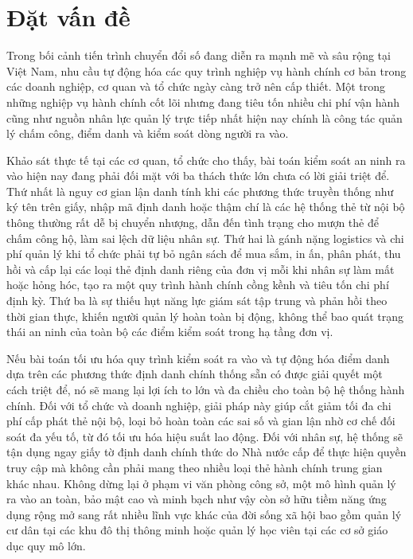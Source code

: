 \documentclass[../DoAn.tex]{subfiles}
\begin{document}
\section{Đặt vấn đề}
\label{section:1.1}

Trong bối cảnh tiến trình chuyển đổi số đang diễn ra mạnh mẽ và sâu rộng tại Việt Nam, nhu cầu tự động hóa các quy trình nghiệp vụ hành chính cơ bản trong các doanh nghiệp, cơ quan và tổ chức ngày càng trở nên cấp thiết. Một trong những nghiệp vụ hành chính cốt lõi nhưng đang tiêu tốn nhiều chi phí vận hành cũng như nguồn nhân lực quản lý trực tiếp nhất hiện nay chính là công tác quản lý chấm công, điểm danh và kiểm soát dòng người ra vào. 

Khảo sát thực tế tại các cơ quan, tổ chức cho thấy, bài toán kiểm soát an ninh ra vào hiện nay đang phải đối mặt với ba thách thức lớn chưa có lời giải triệt để. Thứ nhất là nguy cơ gian lận danh tính khi các phương thức truyền thống như ký tên trên giấy, nhập mã định danh hoặc thậm chí là các hệ thống thẻ từ nội bộ thông thường rất dễ bị chuyển nhượng, dẫn đến tình trạng cho mượn thẻ để chấm công hộ, làm sai lệch dữ liệu nhân sự. Thứ hai là gánh nặng logistics và chi phí quản lý khi tổ chức phải tự bỏ ngân sách để mua sắm, in ấn, phân phát, thu hồi và cấp lại các loại thẻ định danh riêng của đơn vị mỗi khi nhân sự làm mất hoặc hỏng hóc, tạo ra một quy trình hành chính cồng kềnh và tiêu tốn chi phí định kỳ. Thứ ba là sự thiếu hụt năng lực giám sát tập trung và phản hồi theo thời gian thực, khiến người quản lý hoàn toàn bị động, không thể bao quát trạng thái an ninh của toàn bộ các điểm kiểm soát trong hạ tầng đơn vị.

Nếu bài toán tối ưu hóa quy trình kiểm soát ra vào và tự động hóa điểm danh dựa trên các phương thức định danh chính thống sẵn có được giải quyết một cách triệt để, nó sẽ mang lại lợi ích to lớn và đa chiều cho toàn bộ hệ thống hành chính. Đối với tổ chức và doanh nghiệp, giải pháp này giúp cắt giảm tối đa chi phí cấp phát thẻ nội bộ, loại bỏ hoàn toàn các sai số và gian lận nhờ cơ chế đối soát đa yếu tố, từ đó tối ưu hóa hiệu suất lao động. Đối với nhân sự, hệ thống sẽ tận dụng ngay giấy tờ định danh chính thức do Nhà nước cấp để thực hiện quyền truy cập mà không cần phải mang theo nhiều loại thẻ hành chính trung gian khác nhau. Không dừng lại ở phạm vi văn phòng công sở, một mô hình quản lý ra vào an toàn, bảo mật cao và minh bạch như vậy còn sở hữu tiềm năng ứng dụng rộng mở sang rất nhiều lĩnh vực khác của đời sống xã hội bao gồm quản lý cư dân tại các khu đô thị thông minh hoặc quản lý học viên tại các cơ sở giáo dục quy mô lớn.
\end{document}
